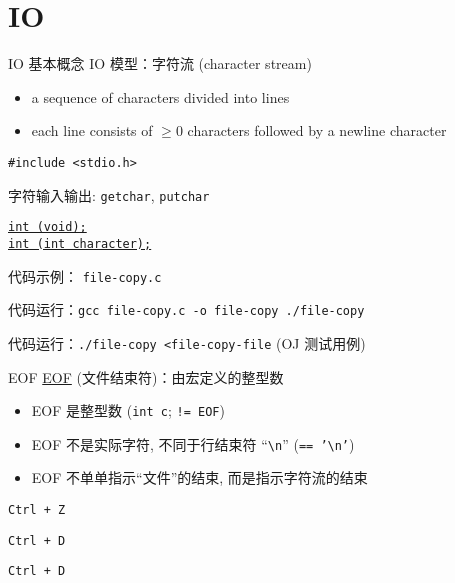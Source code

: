 \section{IO}

\begin{frame}{IO 基本概念}
  IO 模型：字符流 (character stream)
  \begin{itemize}
    \item a sequence of characters divided into lines
    \item each line consists of $\ge 0$ characters followed by a newline character 
  \end{itemize}

  \vspace{0.80cm}
  \centerline{\texttt{\#include <stdio.h>}}
\end{frame}

\begin{frame}{字符输入输出: \texttt{getchar}, \texttt{putchar}}
  \begin{center}
    \href{http://www.cplusplus.com/reference/cstdio/getchar/}{\texttt{int (void);}} \\[8pt]
    \href{http://www.cplusplus.com/reference/cstdio/putchar/}{\texttt{int (int character);}}
  \end{center}

  \vspace{0.50cm}
  \centerline{代码示例： \texttt{file-copy.c}}

  \pause
  \vspace{0.50cm}
  \centerline{代码运行：\texttt{gcc file-copy.c -o file-copy \;\;  ./file-copy}}

  \pause
  \vspace{0.80cm}
  \centerline{代码运行：\texttt{./file-copy <file-copy-file} (OJ 测试用例)}
\end{frame}

\begin{frame}{EOF}
  \href{http://www.cplusplus.com/reference/cstdio/EOF/}{EOF} (文件结束符)：由宏定义的整型数
  \begin{itemize}
    \item EOF 是整型数 (\texttt{int c}; \texttt{!= EOF})
    \item EOF 不是实际字符, 不同于行结束符 ``\texttt{\textbackslash n}'' (\texttt{== '\textbackslash n'})
    \item EOF 不单单指示``文件''的结束, 而是指示字符流的结束
  \end{itemize}

  \begin{description}[Windows]
    \item[Windows] \texttt{Ctrl + Z}
    \item[Linux] \texttt{Ctrl + D}
    \item[Mac] \texttt{Ctrl + D}
  \end{description}
\end{frame}

